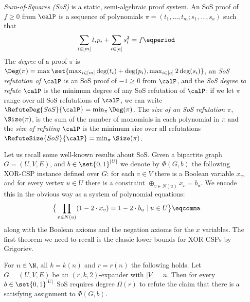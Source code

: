 %

\begin{definition}
  \emph{Sum-of-Squares (SoS)} is a static, semi-algebraic proof
  system. An SoS proof of $f \ge 0$ from $\calP$ is a sequence of
  polynomials $\pi = (t_1, \ldots, t_m; s_1, \ldots, s_a)$ such that
  \begin{align*}
    \sum_{i \in [m]} t_i p_i +
    \sum_{i \in [a]} s^2_i = f \eqperiod %
  \end{align*}
  The \emph{degree} of a proof $\pi$ is
  $\Deg(\pi) = \max \set{ \max_{i \in [m]} \deg(t_i) + \deg(p_i),
    \max_{i \in [a]} 2 \deg(s_i) }$, an \emph{SoS refutation of
    $\calP$} is an SoS proof of $-1 \ge 0$ from $\calP$, and the
  \emph{SoS degree to refute $\calP$} is the minimum degree of any SoS
  refutation of $\calP$: if we let $\pi$ range over all SoS
  refutations of $\calP$, we can write
  $\RefuteDeg{SoS}{\calP} = \min_\pi \Deg(\pi)$.  The \emph{size of an
    SoS refutation $\pi$}, $\Size(\pi)$, is the sum of the number of
  monomials in each polynomial in $\pi$ and the \emph{size of refuting
    $\calP$} is the minimum size over all refutations
  $\RefuteSize{SoS}{\calP} = \min_{\pi} \Size(\pi)$.
\end{definition}


Let us recall some well-known results about SoS. Given a bipartite
graph $G = (U, V, E)$, and $b \in \set{0,1}^{|U|}$ we denote by
$\Phi(G,b)$ the following XOR-CSP instance defined over $G$: for each
$v \in V$ there is a Boolean variable $x_v$, and for every vertex
$u \in U$ there is a constraint $\oplus_{v \in N(u)} x_v = b_u$.
We encode this in the obvious way as a system of polynomial equations: 
\begin{align*}
  \big\{
  \prod_{v \in N(u)} (1 - 2 \cdot x_v) = 1 - 2 \cdot b_u
  \mid u \in U
  \big\} \eqcomma
\end{align*}
along with the Boolean axioms and the negation axioms for the $x$
variables. The first theorem we need to recall is the classic lower
bounds for XOR-CSPs by Grigoriev.

\begin{theorem}\label{thm:sos-xor}
  For $n \in \N$, all $k = k(n)$ and $r = r(n)$ the following holds.
  Let $G = (U, V, E)$ be an $(r, k, 2)$-expander with $|V| = n$. Then
  for every $b \in \set{0,1}^{|U|}$ SoS requires degree $\Omega(r)$ to
  refute the claim that there is a satisfying assignment to
  $\Phi(G, b)$.
\end{theorem}


